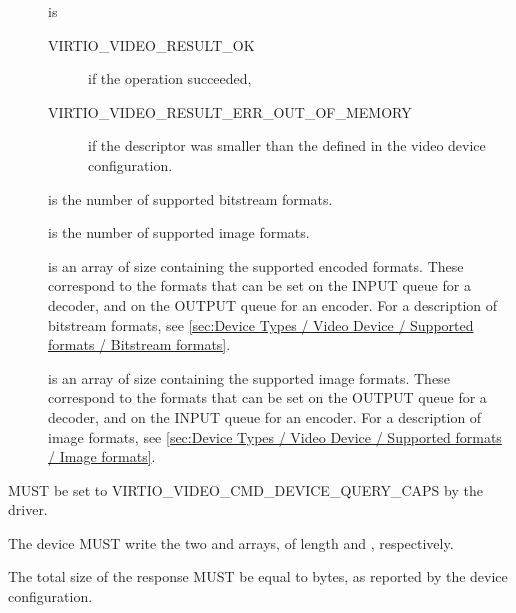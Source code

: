\begin{description}
\item[]
is

\begin{description}
\item[VIRTIO\_VIDEO\_RESULT\_OK]
if the operation succeeded,
\item[VIRTIO\_VIDEO\_RESULT\_ERR\_OUT\_OF\_MEMORY]
if the descriptor was smaller than the defined  in
the video device configuration.
\end{description}
\item[]
is the number of supported bitstream formats.
\item[]
is the number of supported image formats.
\item[]
is an array of size  containing the
supported encoded formats. These correspond to the formats that can be
set on the INPUT queue for a decoder, and on the OUTPUT queue for an
encoder. For a description of bitstream formats, see
\ref{sec:Device Types / Video Device / Supported formats / Bitstream formats}.
\item[]
is an array of size  containing the supported
image formats. These correspond to the formats that can be set on the
OUTPUT queue for a decoder, and on the INPUT queue for an encoder. For a
description of image formats, see
\ref{sec:Device Types / Video Device / Supported formats / Image formats}.
\end{description}


 MUST be set to VIRTIO\_VIDEO\_CMD\_DEVICE\_QUERY\_CAPS
by the driver.


The device MUST write the two  and
 arrays, of length 
and , respectively.

The total size of the response MUST be equal to 
bytes, as reported by the device configuration.

